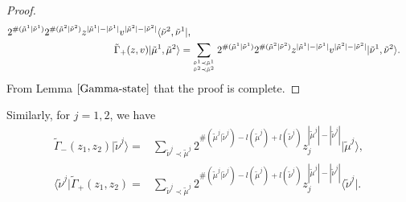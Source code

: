 \documentclass[11pt,reqno]{amsart}
\numberwithin{equation}{section}
\begin{document}
\begin{proof}
\begin{align}
			2^{\#(\tilde{\mu}^{1}|\tilde{\nu}^{1})}
			2^{\#(\tilde{\mu}^{2}|\tilde{\nu}^{2}) }
			z^{|\tilde{\mu}^{1}| - |\tilde{\nu}^{1}|} v^{|\tilde{\mu}^{2}| - |\tilde{\nu}^{2}|}\langle \tilde{\nu}^2,\tilde{\nu}^1|, \label{Gamma-left}\\
			\tilde{\Gamma}_+(z,v)|\tilde{\mu}^1,\tilde{\mu}^2 \rangle
			=&\sum_{{\tilde{\nu}^1 \prec \tilde{\mu}^1}	\atop{\tilde{\nu}^2 \prec \tilde{\mu}^2}}
			2^{\#(\tilde{\mu}^{1}|\tilde{\nu}^{1})}
			2^{\#(\tilde{\mu}^{2}|\tilde{\nu}^{2}) }
			z^{|\tilde{\mu}^{1}| - |\tilde{\nu}^{1}|} v^{|\tilde{\mu}^{2}| - |\tilde{\nu}^{2}|}|\tilde{\nu}^1,\tilde{\nu}^2 \rangle .\label{Gamma+right}
		\end{align}
From Lemma $\ref{Gamma-state}$ that the proof is complete.
	\end{proof}
Similarly, for $j=1,2$, we have	
	\begin{align}
		\tilde{\Gamma}_-(z_{1},z_{2}) |\tilde{\nu}^j \rangle
		=&\sum_{\tilde{\nu}^j \prec \tilde{\mu}^j	}
		2^{\#(\tilde{\mu}^{j}|\tilde{\nu}^{j}) - l(\tilde{\mu}^{j})+l(\tilde{\nu}^{j})}
		z_{j}^{|\tilde{\mu}^{j}| - |\tilde{\nu}^{j}|}
		| \tilde{\mu}^{j}\rangle,   \label{Gamma-right-1}\\
		\langle \tilde{\nu}^j|\tilde{\Gamma}_+(z_{1},z_{2})
		=&\sum_{\tilde{\nu}^j \prec \tilde{\mu}^j	}
		2^{\#(\tilde{\mu}^{j}|\tilde{\nu}^{j}) - l(\tilde{\mu}^{j})+l(\tilde{\nu}^{j})}
		z_{j}^{|\tilde{\mu}^{j}| - |\tilde{\nu}^{j}|}
		\langle \tilde{\nu}^j|.\label{Gamma+left-1}
	\end{align}
	
\end{document}
